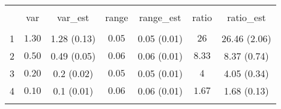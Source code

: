 
\begin{table}[!htbp] \centering 
  \caption{} 
  \label{} 
\begin{tabular}{@{\extracolsep{5pt}} ccccccc} 
\\[-1.8ex]\hline 
\hline \\[-1.8ex] 
 & var & var\_est & range & range\_est & ratio & ratio\_est \\ 
\hline \\[-1.8ex] 
1 & $1.30$ & 1.28 (0.13) & $0.05$ & 0.05 (0.01) & $26$ & 26.46 (2.06) \\ 
2 & $0.50$ & 0.49 (0.05) & $0.06$ & 0.06 (0.01) & $8.33$ & 8.37 (0.74) \\ 
3 & $0.20$ & 0.2 (0.02) & $0.05$ & 0.05 (0.01) & $4$ & 4.05 (0.34) \\ 
4 & $0.10$ & 0.1 (0.01) & $0.06$ & 0.06 (0.01) & $1.67$ & 1.68 (0.13) \\ 
\hline \\[-1.8ex] 
\end{tabular} 
\end{table} 
